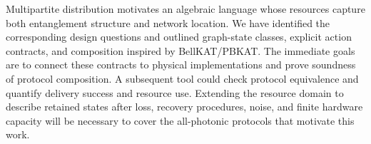 
Multipartite distribution motivates an algebraic language whose resources capture both entanglement structure and network location. We have identified the corresponding design questions and outlined graph-state classes, explicit action contracts, and composition inspired by BellKAT/PBKAT. The immediate goals are to connect these contracts to physical implementations and prove soundness of protocol composition. A subsequent tool could check protocol equivalence and quantify delivery success and resource use. Extending the resource domain to describe retained states after loss, recovery procedures, noise, and finite hardware capacity will be necessary to cover the all-photonic protocols that motivate this work.
